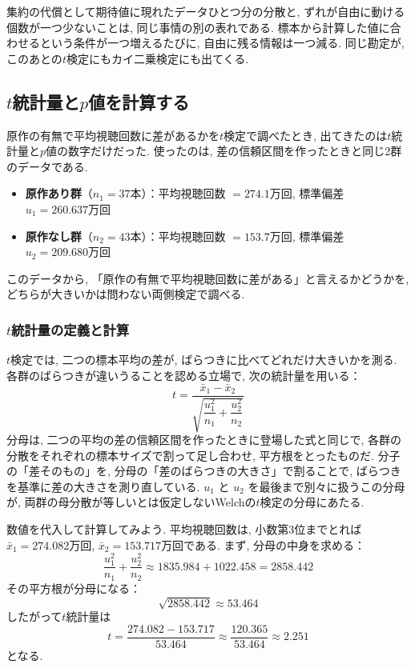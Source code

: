     集約の代償として期待値に現れたデータひとつ分の分散と, ずれが自由に動ける個数が一つ少ないことは, 同じ事情の別の表れである.
    標本から計算した値に合わせるという条件が一つ増えるたびに, 自由に残る情報は一つ減る.
    同じ勘定が, このあとの$t$検定にもカイ二乗検定にも出てくる.


  \subsection{\texorpdfstring{$t$}{t}統計量と\texorpdfstring{$p$}{p}値を計算する}

    原作の有無で平均視聴回数に差があるかを$t$検定で調べたとき, 出てきたのは$t$統計量と$p$値の数字だけだった.
    使ったのは, 差の信頼区間を作ったときと同じ2群のデータである.
    \begin{itemize}
      \item \textbf{原作あり群}（$n_1 = 37$本）：平均視聴回数 $= 274.1$万回, 標準偏差 $u_1 = 260.637$万回
      \item \textbf{原作なし群}（$n_2 = 43$本）：平均視聴回数 $= 153.7$万回, 標準偏差 $u_2 = 209.680$万回
    \end{itemize}
    このデータから, 「原作の有無で平均視聴回数に差がある」と言えるかどうかを, どちらが大きいかは問わない両側検定で調べる.

    \subsubsection*{\texorpdfstring{$t$}{t}統計量の定義と計算}

    $t$検定では, 二つの標本平均の差が, ばらつきに比べてどれだけ大きいかを測る.
    各群のばらつきが違いうることを認める立場で, 次の統計量を用いる：
    \[
      t = \frac{\bar{x}_1 - \bar{x}_2}{\sqrt{\dfrac{u_1^2}{n_1} + \dfrac{u_2^2}{n_2}}}
    \]
    分母は, 二つの平均の差の信頼区間を作ったときに登場した式と同じで, 各群の分散をそれぞれの標本サイズで割って足し合わせ, 平方根をとったものだ.
    分子の「差そのもの」を, 分母の「差のばらつきの大きさ」で割ることで, ばらつきを基準に差の大きさを測り直している.
    $u_1$ と $u_2$ を最後まで別々に扱うこの分母が, 両群の母分散が等しいとは仮定しないWelchの$t$検定の分母にあたる.

    数値を代入して計算してみよう.
    平均視聴回数は, 小数第3位までとれば $\bar{x}_1 = 274.082$万回, $\bar{x}_2 = 153.717$万回である.
    まず, 分母の中身を求める：
    \[
      \frac{u_1^2}{n_1} + \frac{u_2^2}{n_2} \approx 1835.984 + 1022.458 = 2858.442
    \]
    その平方根が分母になる：
    \[
      \sqrt{2858.442} \approx 53.464
    \]
    したがって$t$統計量は
    \[
      t = \frac{274.082 - 153.717}{53.464} \approx \frac{120.365}{53.464} \approx 2.251
    \]
    となる.

